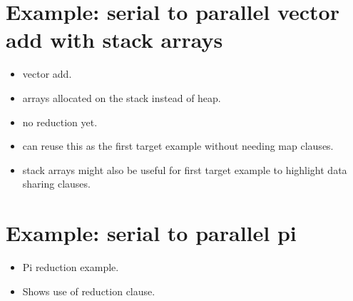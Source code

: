\section{Example: serial to parallel vector add with stack arrays}
\begin{itemize}
  \item vector add.
  \item arrays allocated on the stack instead of heap.
  \item no reduction yet.
  \item can reuse this as the first target example without needing map clauses.
  \item stack arrays might also be useful for first target example to highlight data sharing clauses.
\end{itemize}

\section{Example: serial to parallel pi}
\begin{itemize}
  \item Pi reduction example.
  \item Shows use of reduction clause.
\end{itemize}


